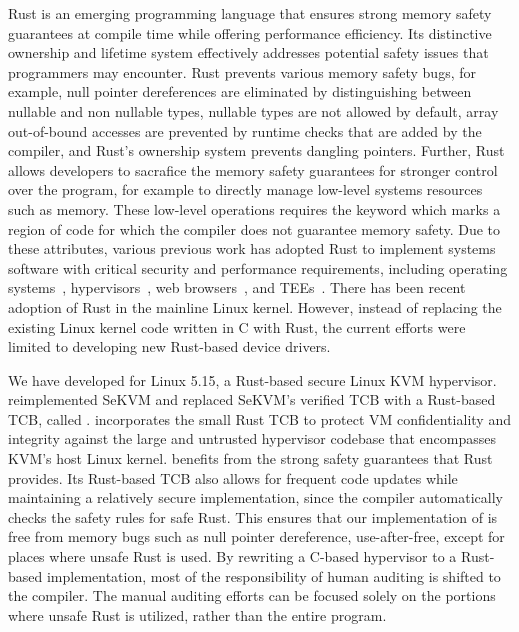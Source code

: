 Rust is an emerging programming language that ensures strong memory safety
guarantees at compile time while offering performance efficiency.
Its distinctive ownership and lifetime system
effectively addresses potential safety issues that programmers may encounter.
Rust prevents various memory safety bugs, for example, null pointer
dereferences are eliminated by distinguishing between nullable and non
nullable types, nullable types are not allowed by default, array out-of-bound
accesses are prevented by runtime checks that are added by the compiler, and
Rust's ownership system prevents dangling pointers.
Further, Rust allows developers to
sacrafice the memory safety guarantees for stronger control over the program,
for example to directly manage low-level systems resources such as memory.
These low-level operations requires the  keyword which marks a
region of code for which the compiler does not guarantee memory safety.
Due to these
attributes, various previous work has adopted Rust to implement systems
software with critical security and performance requirements, including
operating systems~\cite{NrOS, Redleaf, TockOS, theseus},
hypervisors~\cite{DuVisor, RustyHermit}, web browsers~\cite{servo},
and TEEs~\cite{rustsgx,rustee}.
There has been recent adoption of Rust in the mainline Linux kernel. However,
instead of replacing the existing Linux kernel code written in C with Rust,
the current efforts were limited to developing new Rust-based device drivers.

We have developed \rustsec{} for Linux 5.15, a Rust-based secure Linux KVM hypervisor.
\rustsec{} reimplemented SeKVM \cite{sekvm} and replaced SeKVM's verified TCB
with a Rust-based TCB, called \rustcore{}.
\rustsec{} incorporates the small Rust TCB \rustcore{} to
protect VM confidentiality and integrity against the large and untrusted
hypervisor codebase that encompasses KVM’s host Linux kernel.
\rustsec{} benefits from the strong safety guarantees that Rust provides.
Its Rust-based TCB also allows for frequent code updates while maintaining a
relatively secure implementation, since the compiler automatically checks the
safety rules for safe Rust.
This ensures that our implementation of \rustsec{} is free from memory bugs
such as null pointer dereference, use-after-free, except for places where
unsafe Rust is used.
By rewriting a C-based hypervisor to a Rust-based implementation,
most of the responsibility of human auditing is shifted to the compiler.
The manual auditing efforts can be focused solely on the
portions where unsafe Rust is utilized, rather than the entire program.

